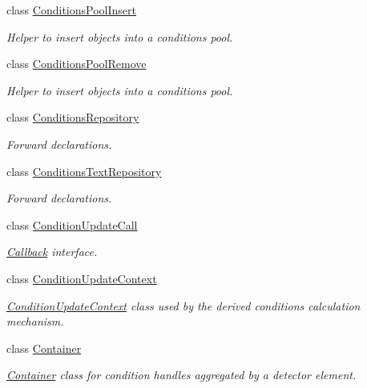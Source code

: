\begin{DoxyCompactItemize}
class \hyperlink{class_d_d4hep_1_1_conditions_1_1_conditions_pool_insert}{Conditions\+Pool\+Insert}
\begin{DoxyCompactList}\small\item\em Helper to insert objects into a conditions pool. \end{DoxyCompactList}\item 
class \hyperlink{class_d_d4hep_1_1_conditions_1_1_conditions_pool_remove}{Conditions\+Pool\+Remove}
\begin{DoxyCompactList}\small\item\em Helper to insert objects into a conditions pool. \end{DoxyCompactList}\item 
class \hyperlink{class_d_d4hep_1_1_conditions_1_1_conditions_repository}{Conditions\+Repository}
\begin{DoxyCompactList}\small\item\em Forward declarations. \end{DoxyCompactList}\item 
class \hyperlink{class_d_d4hep_1_1_conditions_1_1_conditions_text_repository}{Conditions\+Text\+Repository}
\begin{DoxyCompactList}\small\item\em Forward declarations. \end{DoxyCompactList}\item 
class \hyperlink{class_d_d4hep_1_1_conditions_1_1_condition_update_call}{Condition\+Update\+Call}
\begin{DoxyCompactList}\small\item\em \hyperlink{class_d_d4hep_1_1_callback}{Callback} interface. \end{DoxyCompactList}\item 
class \hyperlink{class_d_d4hep_1_1_conditions_1_1_condition_update_context}{Condition\+Update\+Context}
\begin{DoxyCompactList}\small\item\em \hyperlink{class_d_d4hep_1_1_conditions_1_1_condition_update_context}{Condition\+Update\+Context} class used by the derived conditions calculation mechanism. \end{DoxyCompactList}\item 
class \hyperlink{class_d_d4hep_1_1_conditions_1_1_container}{Container}
\begin{DoxyCompactList}\small\item\em \hyperlink{class_d_d4hep_1_1_conditions_1_1_container}{Container} class for condition handles aggregated by a detector element. \end{DoxyCompactList}\item 

\end{DoxyCompactItemize}
